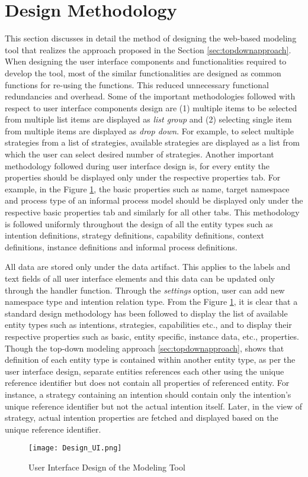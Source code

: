\section{Design Methodology}
\label{sec:designmethodology}
This section discusses in detail the method of designing the web-based modeling tool that realizes the approach proposed in the Section \ref{sec:topdownapproach}. When designing the user interface components and functionalities required to develop the tool, most of the similar functionalities are designed as common functions for re-using the functions. This reduced unnecessary functional redundancies and overhead. Some of the important methodologies followed with respect to user interface components design are (1) multiple items to be selected from multiple list items are displayed as \textit{list group} and (2) selecting single item from multiple items are displayed as \textit{drop down}. For example, to select multiple strategies from a list of strategies, available strategies are displayed as a list from which the user can select desired number of strategies. Another important methodology followed during user interface design is, for every entity the properties should be displayed only under the respective properties tab. For example, in the Figure \ref{fig:samplescreen}, the basic properties such as name, target namespace and process type of an informal process model should be displayed only under the respective basic properties tab and similarly for all other tabs. This methodology is followed uniformly throughout the design of all the entity types such as intention definitions, strategy definitions, capability definitions, context definitions, instance definitions and informal process definitions. 

All data are stored only under the data artifact. This applies to the labels and text fields of all user interface elements and this data can be updated only through the handler function. Through the \textit{settings} option, user can add new namespace type and intention relation type. From the Figure \ref{fig:samplescreen}, it is clear that a standard design methodology has been followed to display the list of available entity types such as intentions, strategies, capabilities etc., and to display their respective properties such as basic, entity specific, instance data, etc., properties. Though the top-down modeling approach \ref{sec:topdownapproach}, shows that definition of each entity type is contained within another entity type, as per the user interface design, separate entities references each other using the unique reference identifier but does not contain all properties of referenced entity. For instance, a strategy containing an intention should contain only the intention's unique reference identifier but not the actual intention itself. Later, in the view of strategy, actual intention properties are fetched and displayed based on the unique reference identifier. 

\begin{figure}
	\centering
	\texttt{[image: Design\_UI.png]}
	\caption{User Interface Design of the Modeling Tool}
	\label{fig:samplescreen}
\end{figure}



